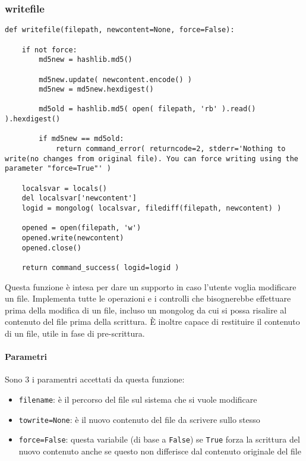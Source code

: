 \documentclass[11pt]{article}
\begin{document}
\subsubsection{writefile}\label{writefile}
\begin{lstlisting}
def writefile(filepath, newcontent=None, force=False):

    if not force:
        md5new = hashlib.md5()

        md5new.update( newcontent.encode() )
        md5new = md5new.hexdigest()

        md5old = hashlib.md5( open( filepath, 'rb' ).read() ).hexdigest()

        if md5new == md5old:
            return command_error( returncode=2, stderr='Nothing to write(no changes from original file). You can force writing using the parameter "force=True"' )

    localsvar = locals()
    del localsvar['newcontent']
    logid = mongolog( localsvar, filediff(filepath, newcontent) )

    opened = open(filepath, 'w')
    opened.write(newcontent)
    opened.close()

    return command_success( logid=logid )
\end{lstlisting}
Questa funzione è intesa per dare un supporto in caso l'utente voglia modificare un file. Implementa tutte le operazioni e i controlli
che bisognerebbe effettuare prima della modifica di un file, incluso un mongolog da cui si possa risalire al contenuto del file
prima della scrittura. È inoltre capace di restituire il contenuto di un file, utile in fase di pre-scrittura.
\paragraph{Parametri}
Sono 3 i paramentri accettati da questa funzione:
\begin{itemize}
	\item{\texttt{filename}: è il percorso del file sul sistema che si vuole modificare}
	\item{\texttt{towrite=None}: è il nuovo contenuto del file da scrivere sullo stesso}
	\item{\texttt{force=False}: questa variabile (di base a \texttt{False}) se \texttt{True} forza la scrittura del nuovo contenuto
		anche se questo non differisce dal contenuto originale del file}
\end{itemize}
\end{document}
